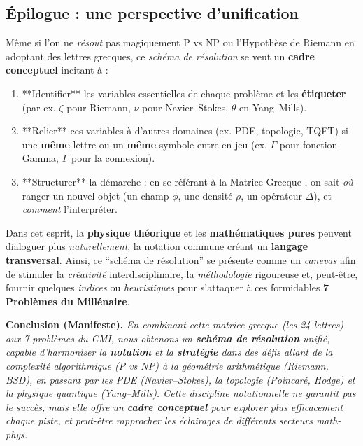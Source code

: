 \documentclass[12pt]{article}
\begin{document}
\subsection{Épilogue : une perspective d’unification}
Même si l’on ne \emph{résout} pas magiquement P vs NP ou l’Hypothèse de Riemann 
en adoptant des lettres grecques, 
ce \emph{schéma de résolution} se veut un \textbf{cadre conceptuel} incitant à :

\begin{enumerate}
    \item **Identifier** les variables essentielles de chaque problème et 
          les \textbf{étiqueter} (par ex. \(\zeta\) pour Riemann, \(\nu\) pour Navier--Stokes, \(\theta\) en Yang--Mills).
    \item **Relier** ces variables à d’autres domaines (ex. PDE, topologie, TQFT) 
          si une \textbf{même} lettre ou un \textbf{même} symbole entre en jeu 
          (ex. \(\Gamma\) pour fonction Gamma, \(\Gamma\) pour la connexion).
    \item **Structurer** la démarche : 
          en se référant à la \og Matrice Grecque \fg{}, 
          on sait \emph{où} ranger un nouvel objet (un champ \(\phi\), une densité \(\rho\), 
          un opérateur \(\Delta\)), et \emph{comment} l’interpréter.
\end{enumerate}

Dans cet esprit, la \textbf{physique théorique} et les \textbf{mathématiques pures} 
peuvent dialoguer plus \emph{naturellement}, 
la notation commune créant un \textbf{langage transversal}. 
Ainsi, ce “schéma de résolution” se présente comme un \emph{canevas} 
afin de stimuler la \emph{créativité} interdisciplinaire, 
la \emph{méthodologie} rigoureuse et, peut-être, fournir 
quelques \emph{indices} ou \emph{heuristiques} pour s’attaquer 
à ces formidables \textbf{7 Problèmes du Millénaire}.

\bigskip

\noindent
\textbf{Conclusion (Manifeste).}\quad
\emph{En combinant cette \og matrice grecque \fg{} (les 24 lettres) aux 7 problèmes du CMI, 
nous obtenons un \textbf{schéma de résolution} unifié, 
capable d’harmoniser la \textbf{notation} et la \textbf{stratégie} 
dans des défis allant de la complexité algorithmique (P vs NP) 
à la géométrie arithmétique (Riemann, BSD), 
en passant par les PDE (Navier--Stokes), la topologie (Poincaré, Hodge) 
et la physique quantique (Yang--Mills). 
Cette \emph{discipline notationnelle} ne garantit pas le succès, 
mais elle offre un \textbf{cadre conceptuel} 
pour \emph{explorer} plus efficacement chaque piste, 
et peut-être rapprocher les éclairages de différents secteurs math-phys.} 

\vspace{1em}
\end{document}
